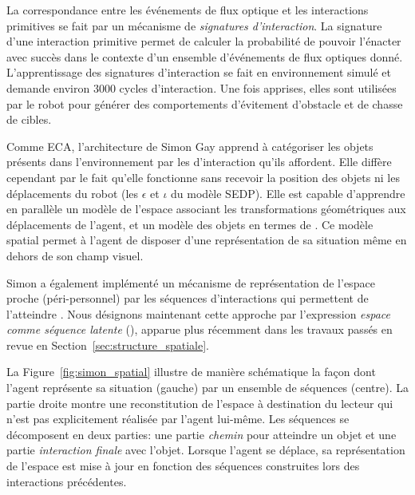 La correspondance entre les événements de flux optique et les interactions primitives se fait par un mécanisme de \emph{signatures d'interaction}.
La signature d'une interaction primitive permet de calculer la probabilité de pouvoir l'énacter avec succès dans le contexte d'un ensemble d'événements de flux optiques donné. 
L'apprentissage des signatures d'interaction se fait en environnement simulé et demande environ 3000 cycles d'interaction. 
Une fois apprises, elles sont utilisées par le robot pour générer des comportements d'évitement d'obstacle et de chasse de cibles. 

Comme ECA, l'architecture de Simon Gay apprend à catégoriser les objets présents dans l'environnement par les  d'interaction qu'ils affordent.
Elle diffère cependant par le fait qu'elle fonctionne sans recevoir la position des objets ni les déplacements du robot (les $\epsilon$ et $\iota$ du modèle SEDP).
Elle est capable d'apprendre en parallèle un modèle de l'espace associant les transformations géométriques aux déplacements de l'agent, et un modèle des objets en termes de .
Ce modèle spatial permet à l'agent de disposer d'une représentation de sa situation même en dehors de son champ visuel. 

Simon a également implémenté un mécanisme de représentation de l'espace proche (péri-personnel) par les séquences d'interactions qui permettent de l'atteindre  \cite[]{gay_autonomous_2017}. 
Nous désignons maintenant cette approche par l'expression \emph{espace comme séquence latente} (), apparue plus récemment dans les travaux passés en revue en Section~\ref{sec:structure_spatiale}. 

La Figure~\ref{fig:simon_spatial} illustre de manière schématique la façon dont l'agent représente sa situation (gauche) par un ensemble de séquences (centre).
La partie droite montre une reconstitution de l'espace à destination du lecteur qui n'est pas explicitement réalisée par l'agent lui-même.
Les séquences se décomposent en deux parties: une partie \emph{chemin} pour atteindre un objet et une partie \emph{interaction finale} avec l'objet. 
Lorsque l'agent se déplace, sa représentation de l'espace est mise à jour en fonction des séquences construites lors des interactions précédentes.


